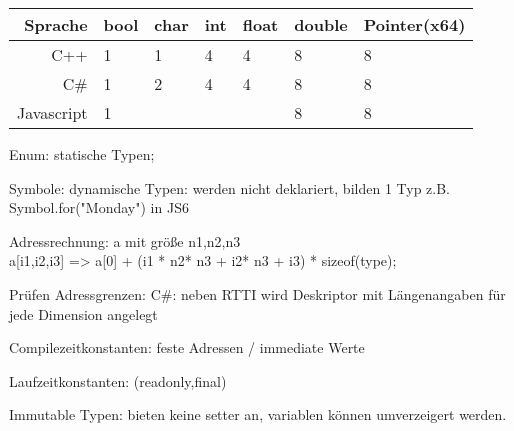 \begin{tabular}{|r|l|l|l|l|l|l|}
\hline
Sprache & bool & char & int & float & double & Pointer(x64) \\ 
\hline
C++ & 1&1 & 4 &4&8&8\\
\hline
C\# & 1&2 & 4 &4&8&8\\
\hline
Javascript & 1 &&&&8&8\\
\hline
\end{tabular}

Enum: statische Typen;

Symbole: dynamische Typen: werden nicht deklariert, bilden 1 Typ z.B. Symbol.for("Monday") in JS6


Adressrechnung: a mit größe n1,n2,n3 \\
a[i1,i2,i3] =>  a[0] + (i1 * n2* n3 + i2* n3 + i3) * sizeof(type);

Prüfen Adressgrenzen: 
C\#: neben RTTI wird Deskriptor mit Längenangaben für jede Dimension angelegt

Compilezeitkonstanten: feste Adressen / immediate Werte

Laufzeitkonstanten: (readonly,final)

Immutable Typen: bieten keine setter an, variablen können umverzeigert werden.

